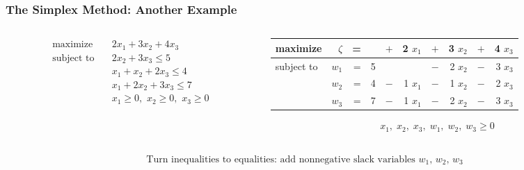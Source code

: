 \documentclass[usenames,dvipsnames,8pt]{beamer}%
\begin{document}
\begin{frame}
  \frametitle{The Simplex Method: Another Example}
  \begin{columns}
    \begin{column}{0.5\textwidth}
      \begin{align*}
        \text{maximize}\quad    &2 x_1 + 3 x_2 + 4 x_3\\
        \text{subject to}\quad  &2 x_2 + 3 x_3 \leqslant 5\\
                                &x_1 + x_2 + 2 x_3 \leqslant 4\\
                                &x_1 + 2 x_2 + 3 x_3 \leqslant 7\\
                                &x_1\geqslant 0,\,\,x_2\geqslant 0,\,\,x_3\geqslant 0
      \end{align*}
    \end{column}
    \begin{column}{0.5\textwidth}
      \begin{table}[ht]
        \centering
        \setlength\tabcolsep{2pt}
        \begin{tabular}{lrrrcrcrcr}
          \toprule
          maximize   &$\zeta$& = &   & $+$ & 2 $x_1$ & $+$ & 3 $x_2$ & $+$ & 4 $x_3$ \\
          \midrule
          subject to & $w_1$ & = & 5 &  &  & $-$ & 2 $x_2$ & $-$ & 3 $x_3$ \\
                     & $w_2$ & = & 4 & $-$ & 1 $x_1$ & $-$ & 1 $x_2$ & $-$ & 2 $x_3$ \\
                     & $w_3$ & = & 7 & $-$ & 1 $x_1$ & $-$ & 2 $x_2$ & $-$ & 3 $x_3$ \\ 
          \bottomrule
        \end{tabular}
      \end{table}
      \vspace{-0.4cm}
      \begin{align*}
        x_1,\;x_2,\;x_3,\;w_1,\;w_2,\;w_3\geqslant 0
      \end{align*}
    \end{column}
  \end{columns}
  \vspace{0.5cm}
  \begin{align*}
    \text{Turn inequalities to equalities: add nonnegative slack variables $w_1$, $w_2$, $w_3$} \\
  \end{align*}
\end{frame}
\end{document}
